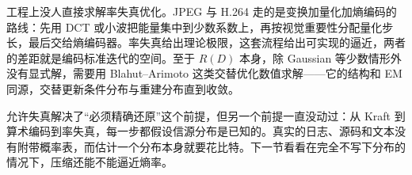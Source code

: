 工程上没人直接求解率失真优化。JPEG 与 H.264 走的是变换加量化加熵编码的路线：先用 DCT 或小波把能量集中到少数系数上，再按视觉重要性分配量化步长，最后交给熵编码器。率失真给出理论极限，这套流程给出可实现的逼近，两者的差距就是编码标准迭代的空间。至于 \(R(D)\) 本身，除 Gaussian 等少数情形外没有显式解，需要用 Blahut--Arimoto 这类交替优化数值求解——它的结构和 EM 同源，交替更新条件分布与重建分布直到收敛。

允许失真解决了``必须精确还原''这个前提，但另一个前提一直没动过：从 Kraft 到算术编码到率失真，每一步都假设信源分布是已知的。真实的日志、源码和文本没有附带概率表，而估计一个分布本身就要花比特。下一节看看在完全不写下分布的情况下，压缩还能不能逼近熵率。
